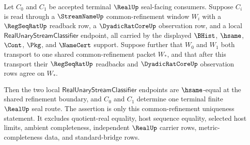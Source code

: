 \begin{theorem}
\label{thm:real-streamname-regseqrat-common-refinement-seal-uniqueness}
Let $C_0$ and $C_1$ be accepted terminal $\RealUp$ seal-facing consumers.
Suppose $C_i$ is read through a $\StreamNameUp$ common-refinement window
$W_i$ with a $\RegSeqRatUp$ readback row, a $\DyadicRatCoreUp$ observation
row, and a local $\mathsf{RealUnaryStreamClassifier}$ endpoint, all carried
by the displayed $\BHist$, $\hsame$, $\Cont$, $\Pkg$, and $\NameCert$
support. Suppose further that $W_0$ and $W_1$ both transport to one shared
common-refinement packet $W_\ast$, and that after this transport their
$\RegSeqRatUp$ readbacks and $\DyadicRatCoreUp$ observation rows agree on
$W_\ast$.

Then the two local $\mathsf{RealUnaryStreamClassifier}$ endpoints are
$\hsame$-equal at the shared refinement boundary, and $C_0$ and $C_1$
determine one terminal finite $\RealUp$ seal route. The assertion is only
this common-refinement uniqueness statement. It excludes quotient-real
equality, host sequence equality, selected host limits, ambient completeness,
independent $\RealUp$ carrier rows, metric-completeness data, and
standard-bridge rows.
\end{theorem}
